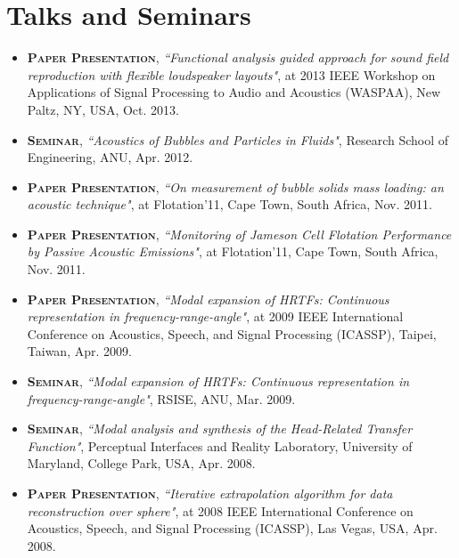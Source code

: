 \documentclass[11pt]{article}
\begin{document}
\section*{Talks and Seminars }
%
\begin{itemize}
%
\item \textsc{\textbf{Paper Presentation}},
\emph{``Functional analysis guided approach for sound field reproduction with flexible loudspeaker layouts"}, at 2013
IEEE Workshop on Applications of Signal Processing to Audio and Acoustics (WASPAA), New Paltz, NY, USA, Oct. 2013.

\item \textsc{\textbf{Seminar}},
\emph{``Acoustics of Bubbles and Particles in Fluids"}, Research School of Engineering, ANU, Apr. 2012.

%
\item \textsc{\textbf{Paper Presentation}},
\emph{``On measurement of bubble solids mass loading: an acoustic technique"}, at Flotation'11, Cape Town, South Africa, Nov. 2011.

\item \textsc{\textbf{Paper Presentation}},
\emph{``Monitoring of Jameson Cell Flotation Performance by Passive Acoustic Emissions"}, at Flotation'11, Cape Town, South Africa, Nov. 2011.

\item \textsc{\textbf{Paper Presentation}},
\emph{``Modal expansion of HRTFs: Continuous representation in frequency-range-angle"}, at 2009 IEEE
International Conference on Acoustics, Speech, and Signal Processing (ICASSP), Taipei, Taiwan, Apr. 2009.

\item \textsc{\textbf{Seminar}},
\emph{``Modal expansion of HRTFs: Continuous representation in frequency-range-angle"}, RSISE, ANU, Mar. 2009.

\item \textsc{\textbf{Seminar}},
\emph{``Modal analysis and synthesis of the Head-Related Transfer Function"}, Perceptual Interfaces and Reality
Laboratory, University of Maryland, College Park, USA, Apr. 2008.

\item \textsc{\textbf{Paper Presentation}},
\emph{``Iterative extrapolation algorithm for data reconstruction over sphere"}, at 2008 IEEE International
Conference on Acoustics, Speech, and Signal Processing (ICASSP), Las Vegas, USA, Apr. 2008.


\end{itemize}
\end{document}
